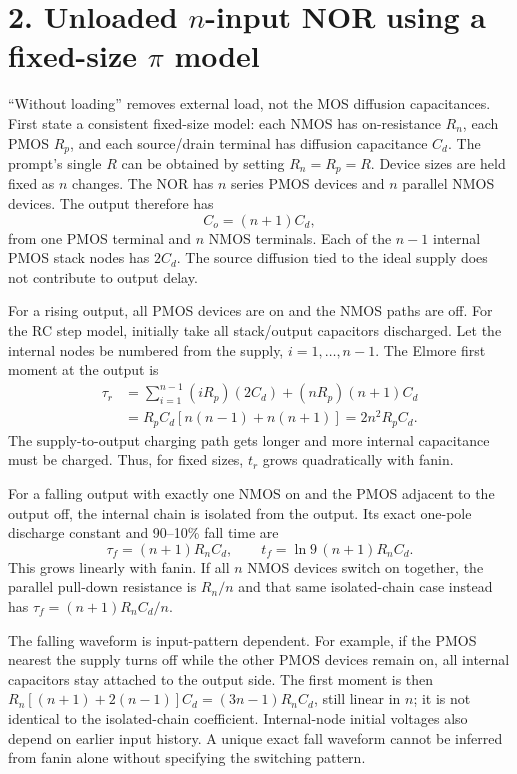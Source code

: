 \documentclass[11pt,a4paper]{article}
\begin{document}
\section*{2. Unloaded $n$-input NOR using a fixed-size $\pi$ model}
``Without loading'' removes external load, not the MOS diffusion
capacitances. First state a consistent fixed-size model: each NMOS has
on-resistance $R_n$, each PMOS $R_p$, and each source/drain terminal has
diffusion capacitance $C_d$. The prompt's single $R$ can be obtained by
setting $R_n=R_p=R$. Device sizes are held fixed as $n$ changes.
The NOR has $n$ series PMOS devices and $n$ parallel NMOS devices.
The output therefore has
\[
 C_o=(n+1)C_d,
\]
from one PMOS terminal and $n$ NMOS terminals. Each of the $n-1$ internal
PMOS stack nodes has $2C_d$. The source diffusion tied to the ideal supply
does not contribute to output delay.

For a rising output, all PMOS devices are on and the NMOS paths are off.
For the RC step model, initially take all stack/output capacitors discharged.
Let the internal nodes be numbered from the supply, $i=1,\ldots,n-1$.
The Elmore first moment at the output is
\begin{align*}
 \tau_r&=\sum_{i=1}^{n-1}(iR_p)(2C_d)+(nR_p)(n+1)C_d\\
 &=R_pC_d[n(n-1)+n(n+1)]
 =\boxed{2n^2R_pC_d}.
\end{align*}
The supply-to-output charging path gets longer and more internal capacitance
must be charged. Thus, for fixed sizes, $t_r$ grows quadratically with fanin.

For a falling output with exactly one NMOS on and the PMOS adjacent to the
output off, the internal chain is isolated from the output. Its exact
one-pole discharge constant and 90--10\% fall time are
\[
 \boxed{\tau_f=(n+1)R_nC_d},\qquad
 \boxed{t_f=\ln9\,(n+1)R_nC_d}.
\]
This grows linearly with fanin. If all $n$ NMOS devices switch on together,
the parallel pull-down resistance is $R_n/n$ and that same isolated-chain
case instead has $\tau_f=(n+1)R_nC_d/n$.

The falling waveform is input-pattern dependent. For example, if the PMOS
nearest the supply turns off while the other PMOS devices remain on, all
internal capacitors stay attached to the output side. The first moment is
then $R_n[(n+1)+2(n-1)]C_d=(3n-1)R_nC_d$, still linear in $n$; it is not
identical to the isolated-chain coefficient. Internal-node initial voltages
also depend on earlier input history. A unique exact fall waveform cannot
be inferred from fanin alone without specifying the switching pattern.
\end{document}
